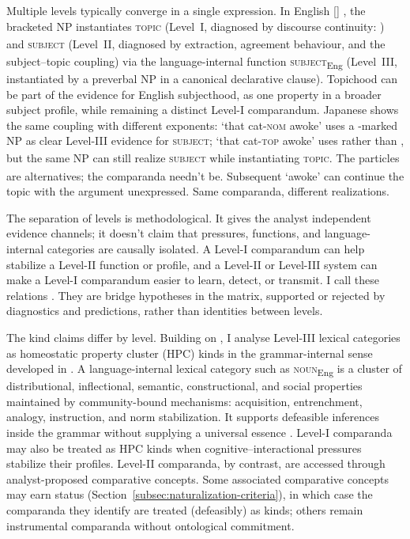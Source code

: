 \documentclass[12pt]{article}
\begin{document}
Multiple levels typically converge in a single expression. In English [] , the bracketed NP instantiates \textsc{topic}\textsubscript{\Cross} (Level~I, diagnosed by discourse continuity: ) and \textsc{subject}\textsubscript{\Cross} (Level~II, diagnosed by extraction, agreement behaviour, and the subject--topic coupling) via the language-internal function \textsc{subject}\textsubscript{Eng} (Level~III, instantiated by a preverbal NP in a canonical declarative clause). Topichood can be part of the evidence for English subjecthood, as one property in a broader subject profile, while remaining a distinct Level-I comparandum. Japanese shows the same coupling with different exponents:  `that cat-\textsc{nom} awoke' uses a -marked NP as clear Level-III evidence for \textsc{subject}\textsubscript{\Cross};  `that cat-\textsc{top} awoke' uses  rather than , but the same NP can still realize \textsc{subject}\textsubscript{\Cross} while instantiating \textsc{topic}\textsubscript{\Cross}. The particles are alternatives; the comparanda needn't be. Subsequent  `awoke' can continue the topic with the argument unexpressed. Same comparanda, different realizations.

The separation of levels is methodological. It gives the analyst independent evidence channels; it doesn't claim that pressures, functions, and language-internal categories are causally isolated. A Level-I comparandum can help stabilize a Level-II function or profile, and a Level-II or Level-III system can make a Level-I comparandum easier to learn, detect, or transmit. I call these relations . They are bridge hypotheses in the matrix, supported or rejected by diagnostics and predictions, rather than identities between levels.

The kind claims differ by level. Building on \textcite{croft2001,HuddlestonPullum2002}, I analyse Level-III lexical categories as homeostatic property cluster (HPC) kinds in the grammar-internal sense developed in \textcite{reynolds2025hpcbook}. A language-internal lexical category such as \textsc{noun}\textsubscript{Eng} is a cluster of distributional, inflectional, semantic, constructional, and social properties maintained by community-bound mechanisms: acquisition, entrenchment, analogy, instruction, and norm stabilization. It supports defeasible inferences inside the grammar without supplying a universal essence \parencite{boyd1991,boyd1999,khalidi2013}. Level-I comparanda may also be treated as HPC kinds when cognitive--interactional pressures stabilize their profiles. Level-II comparanda, by contrast, are accessed through analyst-proposed comparative concepts. Some associated comparative concepts may earn  status (Section~\ref{subsec:naturalization-criteria}), in which case the comparanda they identify are treated (defeasibly) as kinds; others remain instrumental comparanda without ontological commitment.
\end{document}
